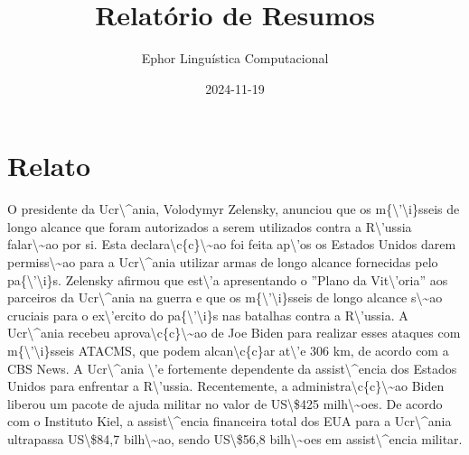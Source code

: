 \documentclass{article}%
\title{Relatório de Resumos}%
\author{Ephor Linguística Computacional}%
\date{2024{-}11{-}19}%
\begin{document}
%
\normalsize%
\section{Relato}%
\label{sec:Relato}%
O presidente da Ucr\textbackslash{}\^{}ania, Volodymyr Zelensky, anunciou que os m\{\textbackslash{}'\textbackslash{}i\}sseis de longo alcance que foram autorizados a serem utilizados contra a R\textbackslash{}'ussia falar\textbackslash{}\textasciitilde{}ao por si. Esta declara\textbackslash{}c\{c\}\textbackslash{}\textasciitilde{}ao foi feita ap\textbackslash{}'os os Estados Unidos darem permiss\textbackslash{}\textasciitilde{}ao para a Ucr\textbackslash{}\^{}ania utilizar armas de longo alcance fornecidas pelo pa\{\textbackslash{}'\textbackslash{}i\}s. Zelensky afirmou que est\textbackslash{}'a apresentando o ''Plano da Vit\textbackslash{}'oria'' aos parceiros da Ucr\textbackslash{}\^{}ania na guerra e que os m\{\textbackslash{}'\textbackslash{}i\}sseis de longo alcance s\textbackslash{}\textasciitilde{}ao cruciais para o ex\textbackslash{}'ercito do pa\{\textbackslash{}'\textbackslash{}i\}s nas batalhas contra a R\textbackslash{}'ussia. A Ucr\textbackslash{}\^{}ania recebeu aprova\textbackslash{}c\{c\}\textbackslash{}\textasciitilde{}ao de Joe Biden para realizar esses ataques com m\{\textbackslash{}'\textbackslash{}i\}sseis ATACMS, que podem alcan\textbackslash{}c\{c\}ar at\textbackslash{}'e 306 km, de acordo com a CBS News. A Ucr\textbackslash{}\^{}ania \textbackslash{}'e fortemente dependente da assist\textbackslash{}\^{}encia dos Estados Unidos para enfrentar a R\textbackslash{}'ussia. Recentemente, a administra\textbackslash{}c\{c\}\textbackslash{}\textasciitilde{}ao Biden liberou um pacote de ajuda militar no valor de US\textbackslash{}\$425 milh\textbackslash{}\textasciitilde{}oes. De acordo com o Instituto Kiel, a assist\textbackslash{}\^{}encia financeira total dos EUA para a Ucr\textbackslash{}\^{}ania ultrapassa US\textbackslash{}\$84,7 bilh\textbackslash{}\textasciitilde{}ao, sendo US\textbackslash{}\$56,8 bilh\textbackslash{}\textasciitilde{}oes em assist\textbackslash{}\^{}encia militar.

%
\end{document}
